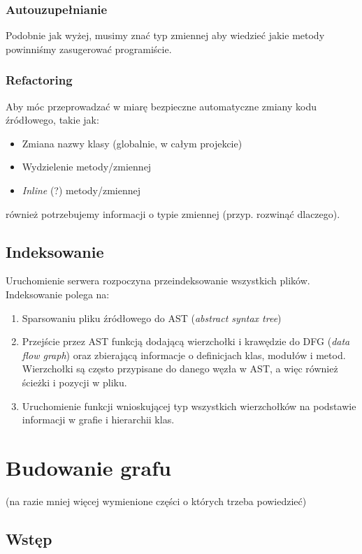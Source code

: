 \documentclass[declaration,shortabstract]{iithesis}
\begin{document}
\subsubsection{Autouzupełnianie}

Podobnie jak wyżej, musimy znać typ zmiennej aby wiedzieć jakie metody powinniśmy zasugerować programiście.

\subsubsection{Refactoring}

Aby móc przeprowadzać w miarę bezpieczne automatyczne zmiany kodu źródłowego, takie jak:
\begin{itemize}
\item Zmiana nazwy klasy (globalnie, w całym projekcie)
\item Wydzielenie metody/zmiennej
\item \textit{Inline} (?) metody/zmiennej
\end{itemize}
również potrzebujemy informacji o typie zmiennej (przyp. rozwinąć dlaczego).

\subsection{Indeksowanie}

Uruchomienie serwera rozpoczyna przeindeksowanie wszystkich plików. Indeksowanie polega na:
\begin{enumerate}
\item Sparsowaniu pliku źródłowego do AST (\textit{abstract syntax tree})
\item Przejście przez AST funkcją dodającą wierzchołki i krawędzie do DFG (\textit{data flow graph}) oraz zbierającą informacje o definicjach klas, modułów i metod. Wierzchołki są często przypisane do danego węzła w AST, a więc również ścieżki i pozycji w pliku.
\item Uruchomienie funkcji wnioskującej typ wszystkich wierzchołków na podstawie informacji w grafie i hierarchii klas.
\end{enumerate}

\section{Budowanie grafu}

(na razie mniej więcej wymienione części o których trzeba powiedzieć)

\subsection{Wstęp}
\end{document}
